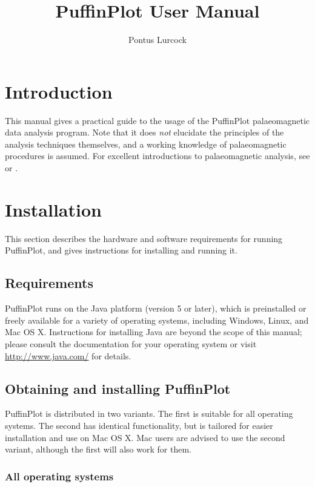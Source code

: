 \documentclass[a4paper]{article}
\title{PuffinPlot User Manual}
\author{Pontus Lurcock}
\date{\HgDate}
\begin{document}
\maketitle

\section{Introduction}

This manual gives a practical guide to the usage of the PuffinPlot
palaeomagnetic data analysis program. Note that it does \emph{not} elucidate
the principles of the analysis techniques themselves, and a working knowledge
of palaeomagnetic procedures is assumed. For excellent introductions to
palaeomagnetic analysis, see \cite{tauxe2010paleomagnetism} or
\cite{butler1992paleomagnetism}.

\section{Installation}

This section describes the hardware and software requirements for
running PuffinPlot, and gives instructions for installing and running
it.

\subsection{Requirements}

PuffinPlot runs on the Java platform (version 5 or later), which is
preinstalled or freely available for a variety of operating systems,
including Windows, Linux, and Mac OS X. Instructions for installing Java
are beyond the scope of this manual; please consult the documentation
for your operating system or visit \url{http://www.java.com/} for
details.

\subsection{Obtaining and installing PuffinPlot}

PuffinPlot is distributed in two variants. The first is suitable for all
operating systems. The second has identical functionality, but is
tailored for easier installation and use on Mac OS X. Mac users are
advised to use the second variant, although the first will also work for
them.

\subsubsection{All operating systems}
\end{document}
